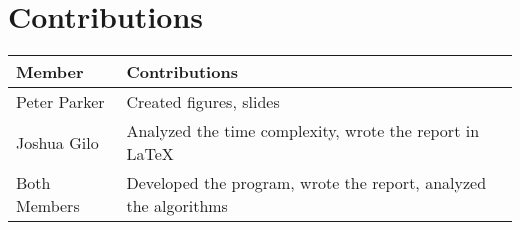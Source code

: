 \section*{Contributions}

\begin{tabular}{|l|l|}
\hline
\textbf{Member} & \textbf{Contributions} \\
\hline
Peter Parker & Created figures, slides \\
Joshua Gilo & Analyzed the time complexity, wrote the report in \LaTeX{} \\
Both Members & Developed the program, wrote the report, analyzed the algorithms \\
\hline
\end{tabular}